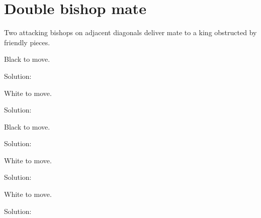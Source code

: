 \documentclass{book}
\begin{document}
\section{Double bishop mate}
Two attacking bishops on adjacent diagonals deliver mate to a king obstructed by friendly pieces.\begin{multicols}{2} 
\begin{samepage} 
\newgame 


 
\showboard
 
 Black to move. 
 
Solution: 
 
\end{samepage}\begin{samepage} 
\newgame 


 
\showboard
 
 White to move. 
 
Solution: 
 
\end{samepage}\begin{samepage} 
\newgame 


 
\showboard
 
 Black to move. 
 
Solution: 
 
\end{samepage}\begin{samepage} 
\newgame 


 
\showboard
 
 White to move. 
 
Solution: 
 
\end{samepage}\begin{samepage} 
\newgame 


 
\showboard
 
 White to move. 
 
Solution: 
 
\end{samepage}\end{multicols} 
\newpage 
\end{document}
